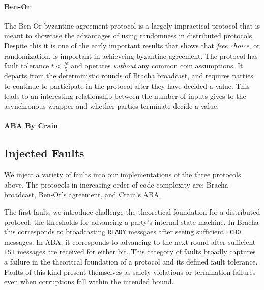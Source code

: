 \paragraph{Ben-Or}
The Ben-Or byzantine agreement protocol is a largely impractical protocol that is meant to showcase the advantages of using randomness in distributed protocols.
Despite this it is one of the early important results that shows that \emph{free choice}, or randomization, is important in achieveing byzantine agreement. 
The protocol has fault tolerance $t < \frac{N}{5}$ and operates \emph{without} any common coin assumptions.
It departs from the deterministic rounds of Bracha broadcast, and requires parties to continue to participate in the protocol after they have decided a value. 
This leads to an interesting relationship between the number of inputs \Z gives to the asynchronous wrapper and whether parties terminate decide a value.

\paragraph{ABA By Crain~\cite{crain}}


\subsection{Injected Faults}
We inject a variety of faults into our implementations of the three protocols above.
The protocols in increasing order of code complexity are: Bracha broadcast, Ben-Or's agreement, and Crain's ABA.

The first faults we introduce challenge the theoretical foundation for a distributed protocol: the thresholds for advancing a party's internal state machine. 
In Bracha this corresponds to broadcasting \texttt{READY} messgaes after seeing sufficient \texttt{ECHO} messages.
In ABA, it corresponds to advancing to the next round after sufficient \texttt{EST} messages are received for either bit.
This category of faults broadly captures a failure in the theoritcal foundation of a protocol and its defined fault tolerance. 
Faults of this kind present themselves as safety violations or termination failures even when corruptions fall within the intended bound. 

